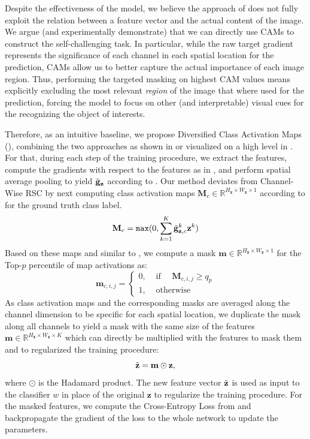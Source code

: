 Despite the effectiveness of the model, we believe the approach of \citet{huang2020selfchallenging} does not fully exploit the relation between a feature vector and the actual content of the image. We argue (and experimentally demonstrate) that we can directly use CAMs to construct the self-challenging task. In particular, while the raw target gradient represents the significance of each channel in each spatial location for the prediction, CAMs allow us to better capture the actual importance of each image region. Thus, performing the targeted masking on highest CAM values means explicitly excluding the most relevant \emph{region} of the image that where used for the prediction, forcing the model to focus on other (and interpretable) visual cues for the recognizing the object of interests. 

Therefore, as an intuitive baseline, we propose Diversified Class Activation Maps (\divcam), combining the two approaches as shown in  or visualized on a high level in . For that, during each step of the training procedure, we extract the features, compute the gradients with respect to the features as in , and perform spatial average pooling to yield $\Tilde{\mathbf{g}}_\mathbf{z}$ according to . Our method deviates from Channel-Wise RSC by next computing class activation maps $\mathbf{M}_c \in \mathbb{R}^{H_\mathbf{z} \times W_\mathbf{z} \times 1}$ according to  for the ground truth class label.
\begin{equation}
\label{eq:Map}
    \mathbf{M}_c = \mathtt{max}(0,\sum_{k=1}^K\Tilde{\mathbf{g}}_{\mathbf{z},c}^k \mathbf{z}^k)
\end{equation}
Based on these maps and similar to , we compute a mask $\mathbf{m} \in \mathbb{R}^{H_\mathbf{z} \times W_\mathbf{z} \times 1}$ for the Top-$p$ percentile of map activations as: 
\begin{equation}
\mathbf{m}_{c,i,j}=\left\{\begin{array}{ll}
0, & \text { if } \quad \mathbf{M}_{c, i,j} \geq q_{p} \\
1, & \text { otherwise }
\end{array}\right.
\label{eq:MaskMap}
\end{equation}
As class activation maps and the corresponding masks are averaged along the channel dimension to be specific for each spatial location, we duplicate the mask along all channels to yield a mask with the same size of the features $\mathbf{m} \in \mathbb{R}^{H_\mathbf{z} \times W_\mathbf{z} \times K}$ which can directly be multiplied with the features to mask them and to regularized the training procedure:
\begin{equation}
\label{eq:mutate}
\Tilde{\mathbf{z}} = \mathbf{m} \odot \mathbf{z},
\end{equation}
where $\odot$ is the Hadamard product. The new feature vector $\Tilde{\mathbf{z}}$ is used as input to the classifier $w$ in place of the original $\mathbf{z}$ to regularize the training procedure. For the masked features, we compute the Cross-Entropy Loss from  and backpropagate the gradient of the loss to the whole network to update the parameters.

